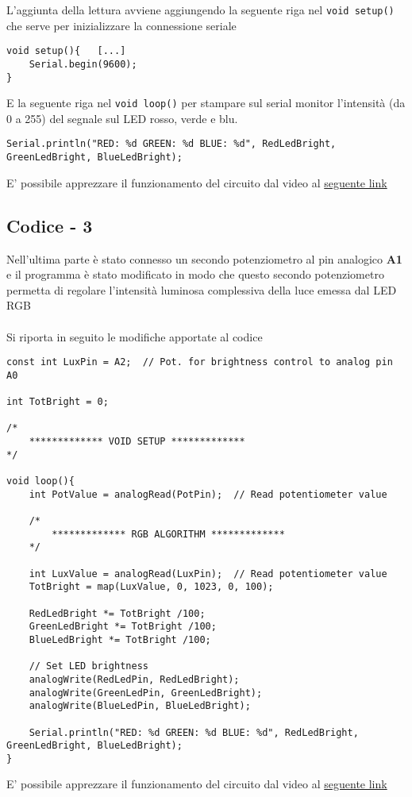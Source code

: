 L'aggiunta della lettura avviene aggiungendo la seguente riga nel \texttt{void setup()} che serve per inizializzare la connessione seriale
\begin{lstlisting}[frame=single, language=Arduino]
void setup(){   [...]
    Serial.begin(9600);
}
\end{lstlisting}
E la seguente riga nel \texttt{void loop()} per stampare sul serial monitor l'intensità (da 0 a 255) del segnale sul LED rosso, verde e blu.
\begin{lstlisting}[frame=single, language=Arduino]
Serial.println("RED: %d GREEN: %d BLUE: %d", RedLedBright, GreenLedBright, BlueLedBright); 
\end{lstlisting}
E' possibile apprezzare il funzionamento del circuito dal video al \href{https://mediaspace.unipd.it/media/Esperimento+2/1_y2jgm47p}{seguente link}
\subsection{Codice - 3}
Nell'ultima parte è stato connesso un secondo potenziometro al pin analogico \textbf{A1} e il programma è stato modificato in modo che questo secondo potenziometro permetta di regolare l’intensità luminosa complessiva della luce emessa dal LED RGB\\\\
Si riporta in seguito le modifiche apportate al codice
\begin{lstlisting}[frame=single, language=Arduino]
const int LuxPin = A2;  // Pot. for brightness control to analog pin A0 

int TotBright = 0;

/*
    ************* VOID SETUP *************
*/

void loop(){
    int PotValue = analogRead(PotPin);  // Read potentiometer value
    
    /*
        ************* RGB ALGORITHM *************
    */
    
    int LuxValue = analogRead(LuxPin);  // Read potentiometer value
    TotBright = map(LuxValue, 0, 1023, 0, 100);

    RedLedBright *= TotBright /100;
    GreenLedBright *= TotBright /100;
    BlueLedBright *= TotBright /100;

    // Set LED brightness
    analogWrite(RedLedPin, RedLedBright); 
    analogWrite(GreenLedPin, GreenLedBright);
    analogWrite(BlueLedPin, BlueLedBright);

    Serial.println("RED: %d GREEN: %d BLUE: %d", RedLedBright, GreenLedBright, BlueLedBright);    
}
\end{lstlisting}
E' possibile apprezzare il funzionamento del circuito dal video al \href{https://mediaspace.unipd.it/media/Esperimento+2.1/1_ewlxzlyv}{seguente link}